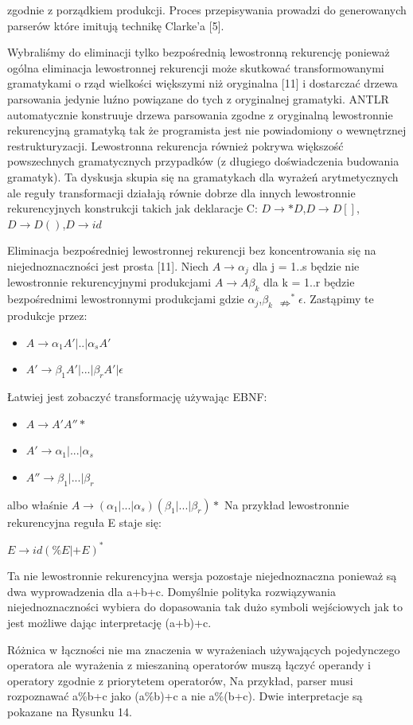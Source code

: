 zgodnie z porządkiem produkcji. Proces przepisywania
prowadzi do generowanych parserów które imitują technikę Clarke'a [5].
\par
Wybraliśmy do eliminacji tylko bezpośrednią lewostronną rekurencję ponieważ ogólna eliminacja lewostronnej 
rekurencji może skutkować transformowanymi gramatykami o rząd wielkości większymi niż oryginalna [11] i
dostarczać drzewa parsowania jedynie luźno powiązane do tych z oryginalnej gramatyki.
ANTLR automatycznie konstruuje drzewa parsowania zgodne z oryginalną lewostronnie rekurencyjną 
gramatyką
tak że programista jest nie powiadomiony o wewnętrznej restrukturyzacji.
Lewostronna rekurencja również pokrywa większość powszechnych gramatycznych przypadków (z długiego
doświadczenia budowania gramatyk). Ta dyskusja skupia się na gramatykach dla wyrażeń arytmetycznych ale 
reguły transformacji działają równie dobrze dla innych lewostronnie rekurencyjnych konstrukcji takich jak 
deklaracje C:
$D\rightarrow *D$,$D\rightarrow D[]$,$D\rightarrow D()$,$D\rightarrow id$
\par
Eliminacja bezpośredniej lewostronnej rekurencji bez koncentrowania się na niejednoznaczności jest prosta
 [11]. Niech $A \rightarrow \alpha_j$ dla j = 1..s będzie nie lewostronnie rekurencyjnymi
produkcjami $A \rightarrow A \beta_k$ dla k = 1..r będzie bezpośrednimi lewostronnymi
produkcjami gdzie $\alpha_j$,$\beta_k$ $\nRightarrow^* \epsilon$.
Zastąpimy te produkcje przez:
\begin{itemize}
\item $A \rightarrow \alpha_1 A'|..|\alpha_s A'$
\item $A'\rightarrow \beta_1A'|...|\beta_rA'|\epsilon$
\end{itemize}
Łatwiej jest zobaczyć transformację używając EBNF:
\begin{itemize}
\item $A \rightarrow A' A'' *$
\item $A' \rightarrow \alpha_1|...|\alpha_s$
\item $A'' \rightarrow \beta_1|...|\beta_r$
\end{itemize}
albo właśnie $A \rightarrow (\alpha_1|...|\alpha_s)(\beta_1|...|\beta_r)*$
Na przykład lewostronnie rekurencyjna reguła E staje się:
\par
$E \rightarrow id (\%E|+E)^*$
\par
Ta nie lewostronnie rekurencyjna wersja pozostaje niejednoznaczna ponieważ są dwa wyprowadzenia dla 
a+b+c. Domyślnie polityka rozwiązywania niejednoznaczności wybiera do dopasowania tak dużo symboli 
wejściowych jak to jest możliwe dając interpretację (a+b)+c.
\par
Różnica w łączności nie ma znaczenia w wyrażeniach używających pojedynczego operatora ale wyrażenia z 
mieszaniną operatorów muszą łączyć operandy i operatory zgodnie z priorytetem operatorów, Na przykład, 
parser musi rozpoznawać a\%b+c jako (a\%b)+c a nie a\%(b+c).
Dwie interpretacje są pokazane na Rysunku 14.

